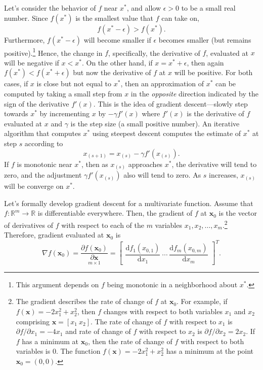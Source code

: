 \documentclass[graybox,envcountchap]{svmono}
\newcommand{\xf}{\mathbf{x}}
\begin{document}
Let's consider the behavior of $f$ near $x^*$, and allow $\epsilon > 0$ to be a small real number.  Since $f(x^*)$ is the smallest value that $f$ can take on, 
\begin{equation*}f(x^*-\epsilon) > f(x^*).\end{equation*}
Furthermore, $f(x^*-\epsilon)$ will become smaller if $\epsilon$ becomes smaller (but remains positive).\footnote{This argument depends on $f$ being monotonic in a neighborhood about $x^*$.} Hence, the change in $f$, specifically, the derivative of $f$, evaluated at $x$ will be negative if $x < x^*$.  On the other hand, if $x =x^* + \epsilon $, then again $ f(x^*) < f(x^* + \epsilon) $ but now the derivative of $f$ at $x$ will be positive. For both cases, if $x$ is close but not equal to $x^*$, then an approximation of $x^*$ can be computed by taking a small step from $x$ in the \emph{opposite} direction indicated by the sign of the derivative $f'(x)$.  This is the idea of gradient descent---slowly step towards $x^*$ by incrementing $x$ by $-\gamma f'(x)$ where $f'(x)$ is the derivative of $f$ evaluated at $x$ and $\gamma$ is the step size (a small positive number). An iterative algorithm that computes $x^*$ using steepest descent computes the estimate of $x^*$ at step $s$ according to 
\begin{equation*}
 x_{(s+1)} = x_{(s)} - \gamma f'(x_{(s)}).
\end{equation*}
If $f$ is monotonic near $x^*$, then as $x_{(s)}$ approaches $x^*$, the derivative will tend to zero, and the adjustment $\gamma f'(x_{(s)})$ also will tend to zero. As $s$ increases, $x_{(s)} $ will be converge on $x^*$.

Let's formally develop gradient descent for a multivariate function. Assume that $f:\mathbb{R}^m \rightarrow \mathbb{R}$ is differentiable everywhere. Then, the gradient of $f$ at $\xf_0$ is the vector of derivatives of $f$ with respect to each of the $m$ variables $x_1,x_2,\ldots,x_m$.\footnote{The gradient describes the rate of change of $f$ at $\xf_0$.  For example, if $f(\xf) = -2x_1^2 + x_2^2$, then $f$ changes with respect to both variables $x_1$ and $x_2$ comprising $\xf = [x_1 \ x_2]$. The rate of change of $f$ with respect to $x_1$ is $\partial f / \partial x_1 =  -4x_1$ and rate of change of $f$ with respect to $x_2$ is $\partial f / \partial x_2 = 2x_2$.  If $f$ has a minimum at $\xf_0$, then the rate of change of $f$ with respect to both variables is 0. The function $f(\xf) = -2x_1^2 + x_2^2$ has a minimum at the point $\xf_0 = (0,0)$.}   Therefore, gradient evaluated at $\xf_0$ is 
\begin{equation*}
 \nabla f(\xf_0) = \underset{m \times 1}{\dfrac{\partial f(\xf_0) }{ \partial \xf}} =\left[ 
 \begin{align}
  \dfrac{\text{d} f_1(x_{0,1})}{\text{d}x_1} \ \cdots \ \dfrac{\text{d} f_m(x_{0,m})}{\text{d}x_m}
 \end{align}
 \right]^T.
\end{equation*}
\end{document}
